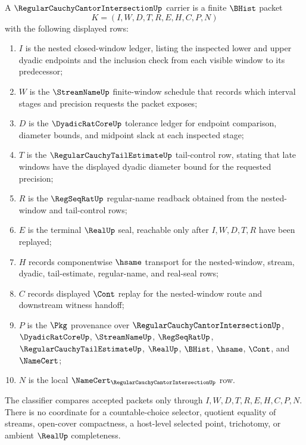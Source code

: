 \begin{definition}
\label{def:regular-cauchy-cantor-intersection-carrier}
A $\RegularCauchyCantorIntersectionUp$ carrier is a finite $\BHist$ packet
$$
K=(I,W,D,T,R,E,H,C,P,N)
$$
with the following displayed rows:
\begin{enumerate}
\item $I$ is the nested closed-window ledger, listing the inspected lower and upper dyadic endpoints and the inclusion check from each visible window to its predecessor;
\item $W$ is the $\StreamNameUp$ finite-window schedule that records which interval stages and precision requests the packet exposes;
\item $D$ is the $\DyadicRatCoreUp$ tolerance ledger for endpoint comparison, diameter bounds, and midpoint slack at each inspected stage;
\item $T$ is the $\RegularCauchyTailEstimateUp$ tail-control row, stating that late windows have the displayed dyadic diameter bound for the requested precision;
\item $R$ is the $\RegSeqRatUp$ regular-name readback obtained from the nested-window and tail-control rows;
\item $E$ is the terminal $\RealUp$ seal, reachable only after $I,W,D,T,R$ have been replayed;
\item $H$ records componentwise $\hsame$ transport for the nested-window, stream, dyadic, tail-estimate, regular-name, and real-seal rows;
\item $C$ records displayed $\Cont$ replay for the nested-window route and downstream witness handoff;
\item $P$ is the $\Pkg$ provenance over $\RegularCauchyCantorIntersectionUp$, $\DyadicRatCoreUp$, $\StreamNameUp$, $\RegSeqRatUp$, $\RegularCauchyTailEstimateUp$, $\RealUp$, $\BHist$, $\hsame$, $\Cont$, and $\NameCert$;
\item $N$ is the local $\NameCert_{\RegularCauchyCantorIntersectionUp}$ row.
\end{enumerate}
The classifier compares accepted packets only through $I,W,D,T,R,E,H,C,P,N$. There is no coordinate for a countable-choice selector, quotient equality of streams, open-cover compactness, a host-level selected point, trichotomy, or ambient $\RealUp$ completeness.
\end{definition}

